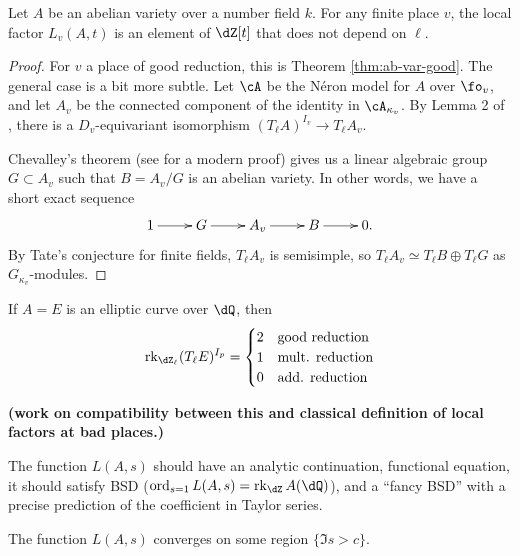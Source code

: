 \begin{theorem}
Let $A$ be an abelian variety over a number field $k$. For any finite place 
$v$, the local factor $L_v(A,t)$ is an element of $\dZ[t]$ that does not depend 
on $\ell$. 
\end{theorem}
\begin{proof}
For $v$ a place of good reduction, this is Theorem \ref{thm:ab-var-good}. The 
general case is a bit more subtle. Let $\cA$ be the N\'eron model for $A$ over 
$\fo_v$, and let $A_v$ be the connected component of the identity in 
$\cA_{\kappa_v}$. By Lemma 2 of \cite{st68}, there is a $D_v$-equivariant 
isomorphism $(T_\ell A)^{I_v} \to T_\ell A_v$. 

Chevalley's theorem (see \cite{co02} for a modern proof) gives us a linear 
algebraic group $G\subset A_v$ such that $B=A_v/G$ is an abelian variety. In 
other words, we have a short exact sequence 
\[\xymatrix{
  1 \ar[r] 
    & G \ar[r] 
    & A_v \ar[r] 
    & B \ar[r] 
    & 0 \text{.} 
}\]
By Tate's conjecture for finite fields, $T_\ell A_v$ is semisimple, so 
$T_\ell A_v\simeq T_\ell B\oplus T_\ell G$ as $G_{\kappa_v}$-modules. 
\end{proof}

If $A=E$ is an elliptic curve over $\dQ$, then 
\[
  \rank_{\dZ_\ell} (T_\ell E)^{I_p}
  =
  \begin{cases}
    2 & \text{good reduction} \\
    1 & \text{mult. reduction} \\
    0 & \text{add. reduction}
  \end{cases}
\]

\textbf{(work on compatibility between this and classical definition of 
local factors at bad places.)}

The function $L(A,s)$ should have an analytic continuation, functional equation, 
it should satisfy BSD ($\ord_{s=1} L(A,s) = \rank_\dZ A(\dQ)$), and a ``fancy BSD'' 
with a precise prediction of the coefficient in Taylor series. 

The function $L(A,s)$ converges on some region $\{\Im s>c\}$. 






